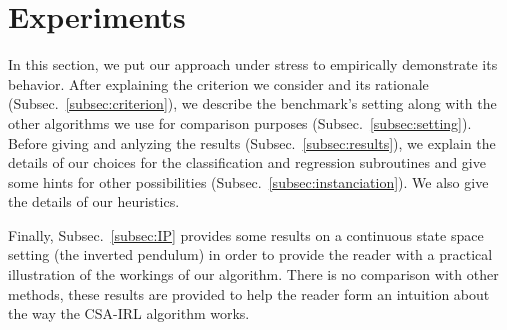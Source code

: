 \documentclass[smallextended]{svjour3}
\begin{document}

\section{Experiments}
\label{sec:experiments}
In this section, we put our approach under stress to empirically demonstrate its behavior. After explaining the criterion we consider and its rationale (Subsec.~\ref{subsec:criterion}), we describe the benchmark's setting along with the other algorithms we use for comparison purposes (Subsec.~\ref{subsec:setting}). Before giving and anlyzing the results (Subsec.~\ref{subsec:results}), we explain the details of our choices for the classification and regression subroutines and give some hints for other possibilities (Subsec.~\ref{subsec:instanciation}). We also give the details of our heuristics.

Finally, Subsec.~\ref{subsec:IP} provides some results on a continuous state space setting (the inverted pendulum) in order to provide the reader with a practical illustration of the workings of our algorithm. There is no comparison with other methods, these results are provided to help the reader form an intuition about the way the CSA-IRL algorithm works.
\end{document}
